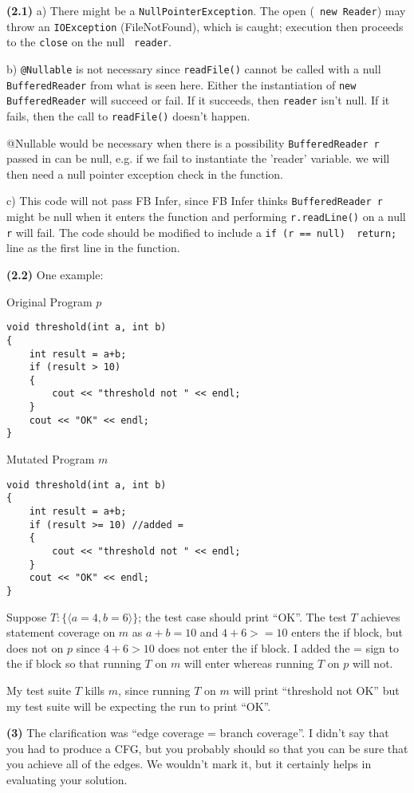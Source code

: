 \documentclass[11pt,onecolumn,letterpaper]{article}
\newcounter{qNum}
\newcommand{\q}[1]{%
\textbf{(#1)}\stepcounter{qNum}}
\begin{document}
\newpage

\q{2.1} a) There might be a {\tt NullPointerException}. The open ({\tt
  new Reader}) may throw an {\tt IOException} (FileNotFound), which is
caught; execution then proceeds to the {\tt close} on the null {\tt
  reader}.

b) {\tt @Nullable} is not necessary since {\tt readFile()} cannot be called with a null {\tt BufferedReader} from what is seen here. Either the instantiation of {\tt new BufferedReader} will succeed or fail. If it succeeds, then {\tt reader} isn't null. If it fails, then the call to {\tt readFile()} doesn't happen.

@Nullable would be necessary when there is a possibility {\tt BufferedReader r} passed in can be null, e.g. if we fail to instantiate the 'reader' variable. we will then need a null pointer exception check in the function.

c) This code will not pass FB Infer, since FB Infer thinks {\tt BufferedReader r} might be null when it enters the function and performing {\tt r.readLine()} on a null {\tt r} will fail. The code should be modified to include a {\tt if (r == null) { return; }} line as the first line in the function.

\q{2.2} One example:

Original Program $p$
\begin{lstlisting}
void threshold(int a, int b)
{
    int result = a+b;
    if (result > 10)
    {
        cout << "threshold not " << endl;
    }
    cout << "OK" << endl;
}
\end{lstlisting}

Mutated Program $m$
\begin{lstlisting}
void threshold(int a, int b)
{
    int result = a+b;
    if (result >= 10) //added =
    {
        cout << "threshold not " << endl;
    }
    cout << "OK" << endl;
}
\end{lstlisting}

Suppose $T: \{ \langle a = 4, b = 6\rangle\}$; the test case should print ``OK''.
The test $T$ achieves statement coverage on $m$ as $a+b=10$ and $4+6>=10$ enters the if block, but does not on $p$ since $4+6>10$ does not enter the if block. I added the = sign to the if block so that running $T$ on $m$ will enter whereas running $T$ on $p$ will not.

My test suite $T$ kills $m$, since running $T$ on $m$ will print ``threshold not OK'' but my test suite will be expecting the run to print ``OK''.

\newpage
\q{3} The clarification was ``edge coverage = branch coverage''. I didn't say that you had to produce a CFG, but you probably should
so that you can be sure that you achieve all of the edges. We wouldn't mark it, but it certainly helps in evaluating your solution.
\end{document}
